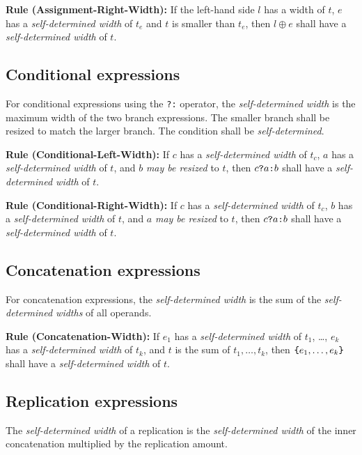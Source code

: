 \documentclass{article}
\newcommand{\sds}{\emph{self-determined width}}
\newcommand{\mbr}{\emph{may be resized}}
\newenvironment{typingrule}[1]%
{\par\noindent\textbf{Rule (#1):} }%
{\par}
\begin{document}
\begin{typingrule}{Assignment-Right-Width}
  If the left-hand side $l$ has a width of $t$, $e$ has a
  \sds{} of $t_{e}$ and $t$ is smaller than $t_{e}$, then
  $l \oplus e$ shall have a \sds{} of $t$.
\end{typingrule}

\subsection{Conditional expressions}%

For conditional expressions using the \texttt{?:} operator, the
\sds{} is the maximum width of the two branch expressions.
The smaller branch shall be resized to match the larger branch. The condition
shall be \emph{self-determined}.

\begin{typingrule}{Conditional-Left-Width}
  If $c$ has a \sds{} of $t_{c}$, $a$ has a
  \sds{} of $t$, and $b$ \mbr{} to $t$,
  then $c \verb|?| a \verb|:| b$ shall have a \sds{} of
  $t$.
\end{typingrule}

\begin{typingrule}{Conditional-Right-Width}
  If $c$ has a \sds{} of $t_{c}$, $b$ has a
  \sds{} of $t$, and $a$ \mbr{} to $t$,
  then $c \verb|?| a \verb|:| b$ shall have a \sds{} of
  $t$.
\end{typingrule}

\subsection{Concatenation expressions}%

For concatenation expressions, the \sds{} is the sum of the
\emph{self-determined widths} of all operands.

\begin{typingrule}{Concatenation-Width}
  If $e_{1}$ has a \sds{} of $t_{1}$, \ldots, $e_{k}$ has a
  \sds{} of $t_{k}$, and $t$ is the sum of
  $t_{1}, \dots, t_{k}$, then $\verb|{|e_{1}, \dots, e_{k}\verb|}|$ shall have
  a \sds{} of $t$.
\end{typingrule}

\subsection{Replication expressions}%

The \sds{} of a replication is the
\sds{} of the inner concatenation multiplied by the
replication amount.
\end{document}
